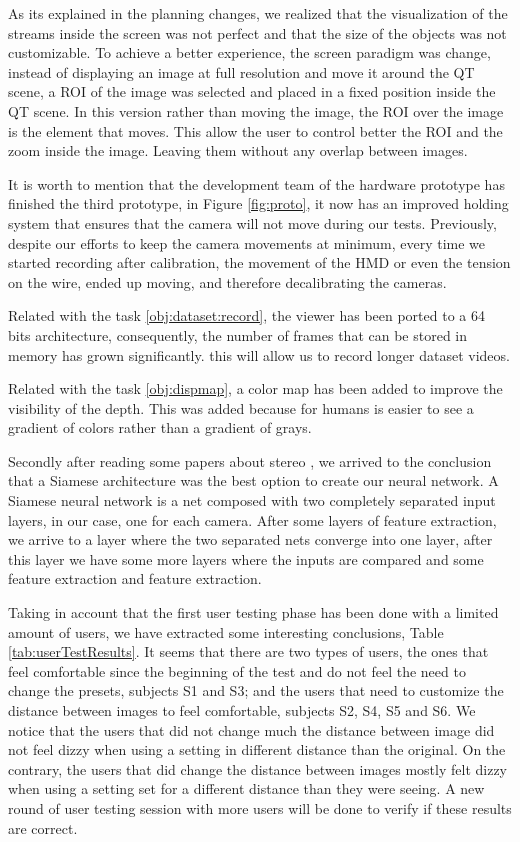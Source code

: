 \documentclass[10pt,a4paper,twocolumn,twoside]{article}
\begin{document}
	As its explained in the planning changes, we realized that the visualization of the streams inside the screen was not perfect and that the size of the objects was not customizable. To achieve a better experience, the screen paradigm was change, instead of displaying an image at full resolution and move it around the QT scene, a ROI of the image was selected and placed in a fixed position inside the QT scene. In this version rather than moving the image, the ROI over the image is the element that moves. This allow the user to control better the ROI and the zoom inside the image. Leaving them without any overlap between images.  

	It is worth to mention that the development team of the hardware prototype has finished the third prototype, in Figure \ref{fig:proto}, it now has an improved holding system that ensures that the camera will not move during our tests. Previously, despite our efforts to keep the camera movements at minimum, every time we started recording after calibration, the movement of the HMD or even the tension on the wire, ended up moving, and therefore decalibrating the cameras.   
	
	Related with the task \ref{obj:dataset:record}, the viewer has been ported to a 64 bits architecture, consequently, the number of frames that can be stored in memory has grown significantly. this will allow us to record longer dataset videos.
	
	Related with the task \ref{obj:dispmap}, a color map has been added to improve the visibility of the depth. This was added  because for humans is easier to see a gradient of colors rather than a gradient of grays.  
	
	Secondly after reading some papers about stereo \cite{redfelipeSintesisStereo},\cite{efficientStereoMatcher} we arrived to the conclusion that a Siamese architecture was the best option to create our neural network. A Siamese neural network is a net composed with two completely separated input layers, in our case, one for each camera. After some layers of feature extraction, we arrive to a layer where the two separated nets converge into one layer, after this layer we have some more layers where the inputs are compared and some feature extraction and feature extraction.
	
	Taking in account that the first user testing phase has been done with a limited amount of users, we have extracted some interesting conclusions, Table \ref{tab:userTestResults}. It seems that there are two types of users, the ones that feel comfortable since the beginning of the test and do not feel the need to change the presets, subjects S1 and S3; and the users that need to customize the distance between images to feel comfortable, subjects S2, S4, S5 and S6.
	We notice that the users that did not change much the distance between image did not feel dizzy when using a setting in different distance than the original. On the contrary, the users that did change the distance between images mostly felt dizzy when using a setting set for a different distance than they were seeing. A new round of user testing session with more users will be done to verify if these results are correct.
	
\end{document}
